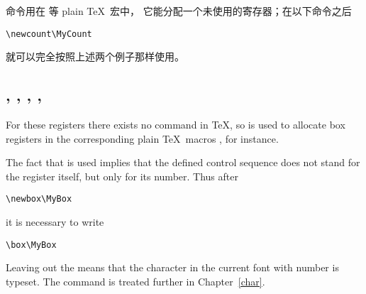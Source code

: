 \documentclass{book}
\begin{document}
 命令用在  等 plain \TeX\ 宏中，
它能分配一个未使用的寄存器；在以下命令之后
\begin{verbatim}
\newcount\MyCount
\end{verbatim}
 就可以完全按照上述两个例子那样使用。

\subsection{, , , , }

For these registers there exists no   command in \TeX,
so  is used to allocate box registers
in the corresponding plain \TeX\ macros , for instance.

The fact that  is used implies that the
defined control sequence does not stand for the register itself,
but only for its number. Thus after
\begin{verbatim}
\newbox\MyBox
\end{verbatim}
it is necessary to write
\begin{verbatim}
\box\MyBox
\end{verbatim} 
Leaving out the  means that the character
in the current font with number
 is typeset. The  command
is treated further in Chapter~\ref{char}.
\end{document}
